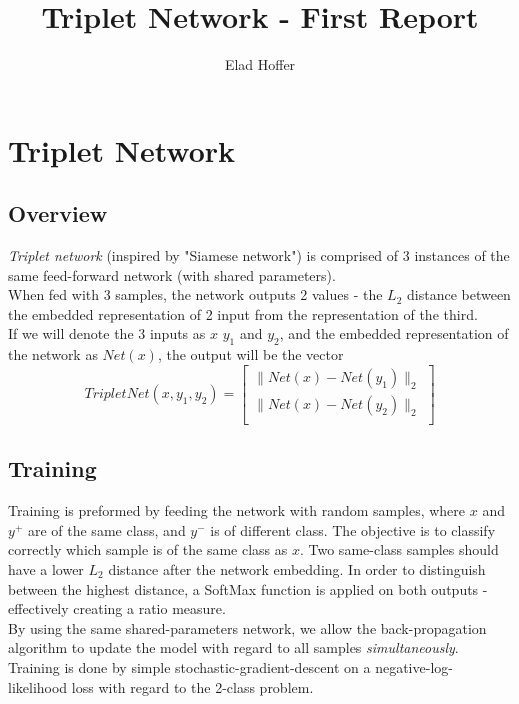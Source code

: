 \documentclass[10pt]{article} %
\title{Triplet Network - First Report}
\author{Elad Hoffer}
\begin{document}
\maketitle
\section{Triplet Network}
\subsection{Overview}
\emph{Triplet network} (inspired by "Siamese network") is comprised of 3 instances of the same feed-forward network (with shared parameters). \\
When fed with 3 samples, the network
outputs 2 values - the $L_2$ distance between the embedded representation of 2 input from the representation of the third. \\
If we will denote the 3 inputs as $x$ $y_1$ and $y_2$, and the
embedded representation of the network as $Net(x)$, the output will be the vector 
\begin{equation*}
    TripletNet(x,y_1,y_2)= \begin{bmatrix}
                       \|Net(x)-Net(y_1)\|_2 \\[0.3em]
                      \|Net(x)-Net(y_2)\|_2 \\

                      \end{bmatrix}
\end{equation*}
\subsection{Training}
Training is preformed by feeding the network with random samples, where $x$ and $y^{+}$ are of the same class, and $y^{-}$ is of different class.
The objective is to classify correctly which sample is of the same class as $x$. Two same-class samples should have a lower $L_2$ distance after the network embedding. In order to distinguish between the highest distance, a SoftMax function is applied on both outputs - effectively creating a ratio measure.\\
By using the same shared-parameters network, we allow the back-propagation algorithm to update the model with regard to all samples \emph{simultaneously}. Training is done
by simple stochastic-gradient-descent on a negative-log-likelihood loss with regard to the 2-class problem. 
\end{document}

